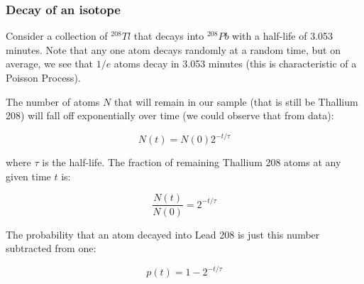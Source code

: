 \subsubsection{Decay of an isotope}\label{decay-of-an-isotope}

Consider a collection of \(^{208}Tl\) that decays into \(^{208}Pb\) with
a half-life of 3.053 minutes. Note that any one atom decays randomly at
a random time, but on average, we see that \(1/e\) atoms decay in 3.053
minutes (this is characteristic of a Poisson Process).

The number of atoms \(N\) that will remain in our sample (that is still
be Thallium 208) will fall off exponentially over time (we could observe
that from data):

\[N(t) = N(0)2^{-t/\tau}\]

where \(\tau\) is the half-life. The fraction of remaining Thallium 208
atoms at any given time \(t\) is:

\[\dfrac{N(t)}{N(0)} = 2^{-t/\tau}\]

The probability that an atom decayed into Lead 208 is just this number
subtracted from one:

\[p(t) = 1 - 2^{-t/\tau}\]

